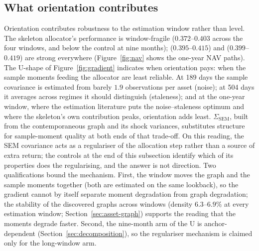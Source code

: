 \subsection{What orientation contributes}
\label{sec:orientation-role}

Orientation contributes robustness to the estimation window rather than
level. The skeleton
allocator's performance is window-fragile ($0.372$--$0.403$ across the four
windows, and below the control at nine months); \skelsem{}
($0.395$--$0.415$) and
\orientsem{} ($0.399$--$0.419$) are strong everywhere
(Figure~\ref{fig:nav} shows the
one-year NAV paths). The U-shape of Figure~\ref{fig:gradient} indicates
when orientation pays: when the sample moments
feeding the allocator are least reliable. At 189 days the sample covariance
is estimated from barely $1.9$ observations per asset (noise); at 504 days
it averages across regimes it should distinguish (staleness); and at the
one-year window, where the estimation literature puts the
noise--staleness optimum and where the skeleton's own contribution peaks,
orientation adds least. $\Sigma_{\mathrm{SEM}}$, built from the
contemporaneous graph and its shock variances, substitutes structure
for sample-moment quality at both ends of that trade-off. On this reading,
the SEM covariance acts as a regulariser of the allocation step rather
than a source of extra return; the controls at the end of this
subsection identify which of its properties does the regularising, and
the answer is not direction. Two qualifications bound the mechanism. First,
the window moves the graph and the sample moments together (both are
estimated on the same lookback), so the gradient cannot by itself
separate moment degradation from graph degradation; the stability of the
discovered graphs across windows (density $6.3$--$6.9\%$ at every
estimation window; Section~\ref{sec:asset-graph}) supports the
reading that the moments degrade faster. Second, the nine-month arm of
the U is anchor-dependent (Section~\ref{sec:decomposition}), so the
regulariser mechanism is claimed only for the long-window arm.


